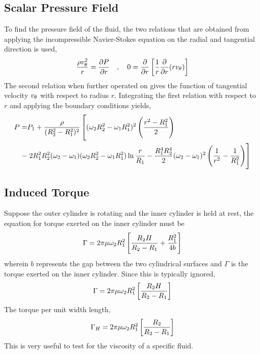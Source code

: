 \documentclass[a4paper, 12pt]{report}
\begin{document}
\begin{center}
\subsection{Scalar Pressure Field}
\begin{comment}
\end{comment}
To find the pressure field of the fluid, the two relations that are obtained from applying the incompressible Navier-Stokes equation on the radial and tangential direction is used,
$$\frac{\rho v_\theta^2}{r} = \frac{\partial P}{\partial r}\quad,\quad0 = \frac{\partial}{\partial r}\left[\frac{1}{r}\frac{\partial}{\partial r}(rv_\theta)\right]$$
The second relation when further operated on gives the function of tangential velocity $v_\theta$ with respect to radius $r$. Integrating the first relation with respect to $r$ and applying the boundary conditions yields,
\begin{equation*}
\begin{split}
P =& P_1 + \frac{\rho}{(R_2^2-R_1^2)^2}\left[(\omega_2R_2^2 - \omega_1R_1^2)^2\left(\frac{r^2 - R_1^2}{2}\right)\right.{}\\
- &\left.{} 2R_1^2R_2^2(\omega_2-\omega_1)(\omega_2R_2^2 - \omega_1R_1^2)\ln\frac{r}{R_1} - \frac{R_1^4R_2^4}{2}(\omega_2-\omega_1)^2\left(\frac{1}{r^2} - \frac{1}{R_1^2}\right)\right]
\end{split}
\end{equation*}
\subsection{Induced Torque}
\begin{comment}
\end{comment}
Suppose the outer cylinder is rotating and the inner cylinder is held at rest, the equation for torque exerted on the inner cylinder must be
$$\Gamma = 2\pi\mu\omega_2R_1^2\left[\frac{R_2H}{R_2-R_1} + \frac{R_1^2}{4b}\right]$$
wherein $b$ represents the gap between the two cylindrical surfaces and $\Gamma$ is the torque exerted on the inner cylinder. Since this is typically ignored,
$$\Gamma = 2\pi\mu\omega_2R_1^2\left[\frac{R_2H}{R_2-R_1}\right]$$
The torque per unit width length,
$$\Gamma_H = 2\pi\mu\omega_2R_1^2\left[\frac{R_2}{R_2-R_1}\right]$$
This is very useful to test for the viscosity of a specific fluid.
\end{center}
\end{document}
